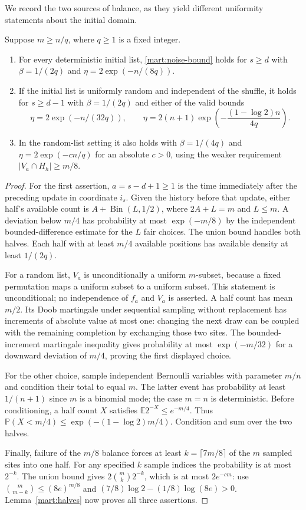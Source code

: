 We record the two sources of balance, as they yield different
uniformity statements about the initial domain.

\begin{lemma}\label{mart:balance}
Suppose $m\ge n/q$, where $q\ge1$ is a fixed integer.
\begin{enumerate}
\item For every deterministic initial list, \eqref{mart:noise-bound}
holds for $s\ge d$ with
$\beta=1/(2q)$ and $\eta=2\exp(-n/(8q))$.
\item If the initial list is uniformly random and independent of the
shuffle, it holds for $s\ge d-1$ with $\beta=1/(2q)$ and either of
the valid bounds
\[
 \eta=2\exp(-n/(32q)),\qquad
 \eta=2(n+1)\exp\!\left(-\frac{(1-\log2)n}{4q}\right).
\]
\item In the random-list setting it also holds with
$\beta=1/(4q)$ and $\eta=2\exp(-c n/q)$ for an absolute $c>0$,
using the weaker requirement $|V_a\cap H_h|\ge m/8$.
\end{enumerate}
\end{lemma}
\begin{proof}
For the first assertion, $a=s-d+1\ge1$ is the time immediately after
the preceding update in coordinate $i_s$.  Given the history before
that update, either half's available count is $A+\operatorname{Bin}(L,1/2)$,
where $2A+L=m$ and $L\le m$.  A deviation below $m/4$ has probability
at most $\exp(-m/8)$ by the independent bounded-difference estimate
for the $L$ fair choices.
The union bound handles both halves.  Each
half with at least $m/4$ available positions has available density at least $1/(2q)$.

For a random list, $V_a$ is unconditionally a uniform $m$-subset,
because a fixed permutation maps a uniform subset to a uniform subset.
This statement is unconditional; no independence of $f_a$ and $V_a$
is asserted.  A half count has mean $m/2$.  Its Doob martingale under
sequential sampling without replacement has increments of absolute
value at most one: changing the next draw can be coupled with the
remaining completion by exchanging those two sites.  The bounded-increment martingale inequality gives probability at most
$\exp(-m/32)$ for a
downward deviation of $m/4$, proving the first displayed choice.

For the other choice, sample independent Bernoulli variables with
parameter $m/n$ and condition their total to equal $m$.  The latter
event has probability at least $1/(n+1)$ since $m$ is a binomial mode;
the case $m=n$ is deterministic.  Before conditioning, a half count
$X$ satisfies $\mathbb E2^{-X}\le e^{-m/4}$.  Thus
$\mathbb P(X<m/4)\le\exp(-(1-\log2)m/4)$.  Condition and sum over
the two halves.

Finally, failure of the $m/8$ balance forces at least
$k=\lceil7m/8\rceil$ of the $m$ sampled sites into one half.  For any
specified $k$ sample indices the probability is at most $2^{-k}$.
The union bound gives $2\binom mk2^{-k}$, which is at most
$2e^{-cm}$: use $\binom m{m-k}\le(8e)^{m/8}$ and
$(7/8)\log2-(1/8)\log(8e)>0$.  Lemma~\ref{mart:halves}
now proves all three assertions.
\end{proof}


